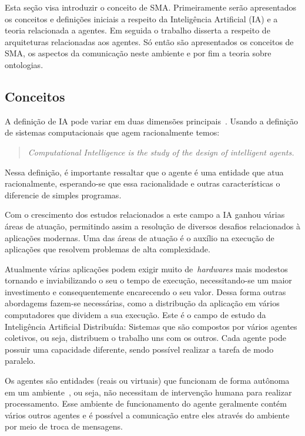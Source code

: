 Esta seção visa introduzir o conceito de SMA. Primeiramente serão apresentados os conceitos e definições iniciais a respeito da Inteligência Artificial (IA) e a teoria relacionada a agentes. Em seguida o trabalho disserta a respeito de arquiteturas relacionadas aos agentes. Só então são apresentados os conceitos de SMA, os aspectos da comunicação neste ambiente e por fim a teoria sobre ontologias.

\subsection{Conceitos}

A definição de IA pode variar em duas dimensões principais~\cite{poole98}. Usando a definição de sistemas computacionais que agem racionalmente temos:

\begin{quote}
\emph{Computational Intelligence is the study of the design of intelligent agents.}
\end{quote}

Nessa definição, é importante ressaltar que o agente é uma entidade que atua racionalmente, esperando-se que essa racionalidade e outras características o diferencie de simples programas.

Com o crescimento dos estudos relacionados a este campo a IA ganhou várias áreas de atuação, permitindo assim a resolução de diversos desafios relacionados à aplicações modernas. Uma das áreas de atuação é o auxílio na execução de aplicações que resolvem problemas de alta complexidade. 

Atualmente várias aplicações podem exigir muito de~\emph{hardwares} mais modestos tornando e inviabilizando o seu o tempo de execução, necessitando-se um maior investimento e consequentemente encarecendo o seu valor. Dessa forma outras abordagems fazem-se necessárias, como a distribução da aplicação em vários computadores que dividem a sua execução. Este é o campo de estudo da Inteligência Artificial Distribuída: Sistemas que são compostos por vários agentes coletivos, ou seja, distribuem o trabalho uns com os outros. Cada agente pode possuir uma capacidade diferente, sendo possível realizar a tarefa de modo paralelo. 

Os agentes são entidades (reais ou virtuais) que funcionam de forma autônoma em um ambiente~\cite{novig95}, ou seja, não necessitam de intervenção humana para realizar processamento. Esse ambiente de funcionamento do agente geralmente contém vários outros agentes e é possível a comunicação entre eles através do ambiente por meio de troca de mensagens.

